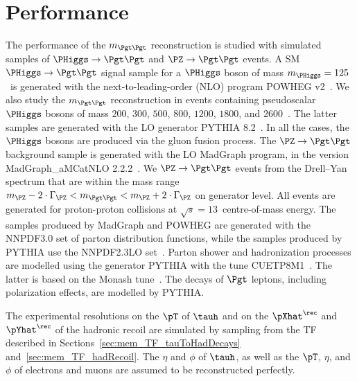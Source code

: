\section{Performance}
\label{sec:performance}

The performance of the $m_{\Pgt\Pgt}$ reconstruction is studied with
simulated samples of $\PHiggs \to \Pgt\Pgt$ and $\PZ \to \Pgt\Pgt$ events.
A SM $\PHiggs \to \Pgt\Pgt$ signal sample for a $\PHiggs$ boson of
mass $m_{\PHiggs} = 125$~\GeV is generated with the next-to-leading-order (NLO) program POWHEG v2~\cite{POWHEG1,POWHEG2,POWHEG3}.
We also study the $m_{\Pgt\Pgt}$ reconstruction in events containing pseudoscalar $\PHiggs$ bosons of mass $200$, $300$, $500$, $800$, $1200$, $1800$, and $2600$~\GeV.
The latter samples are generated with the LO generator PYTHIA 8.2~\cite{pythia8}.
In all the cases, the $\PHiggs$ bosons are produced via the gluon fusion process.
The $\PZ \to \Pgt\Pgt$ background sample is generated with the LO MadGraph program, in the version MadGraph\_aMCatNLO 2.2.2~\cite{MadGraph_aMCatNLO}.
We $\PZ \to \Pgt\Pgt$ events from the Drell--Yan spectrum that are within the mass range $m_{\PZ} - 2 \cdot \Gamma_{\PZ} < m_{\Pgt\Pgt} < m_{\PZ} + 2 \cdot \Gamma_{\PZ}$ on generator level.
All events are generated for proton-proton collisions at $\sqrt{s} = 13$~\TeV centre-of-mass energy.
The samples produced by MadGraph and POWHEG are generated with the NNPDF3.0 set of parton distribution functions,
while the samples produced by PYTHIA use the NNPDF2.3LO set~\cite{NNPDF1,NNPDF2,NNPDF3}.
Parton shower and hadronization processes are modelled using the generator PYTHIA with the tune CUETP8M1~\cite{PYTHIA_CUETP8M1tune_CMS}.
The latter is based on the Monash tune~\cite{PYTHIA_MonashTune}.
The decays of $\Pgt$ leptons, including polarization effects, are modelled by PYTHIA.

The experimental resolutions on the $\pT$ of $\tauh$ and on the $\pXhat^{\rec}$ and $\pYhat^{\rec}$ of the hadronic recoil 
are simulated by sampling from the TF described in
Sections~\ref{sec:mem_TF_tauToHadDecays}
and~\ref{sec:mem_TF_hadRecoil}.
The $\eta$ and $\phi$ of $\tauh$,
as well as the $\pT$, $\eta$, and $\phi$ of electrons and muons are assumed to be reconstructed perfectly.

